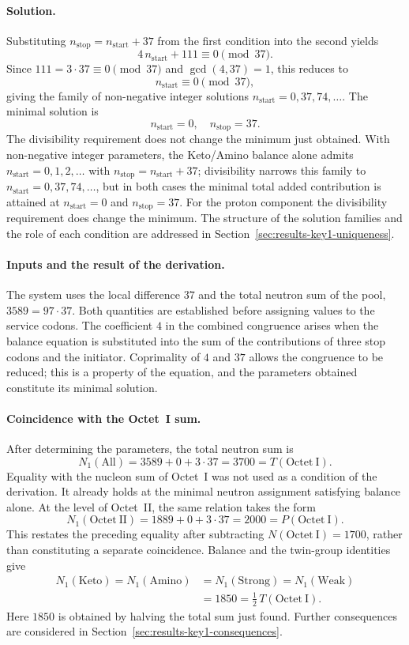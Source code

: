 \documentclass[11pt,a4paper]{article}
\renewcommand{\_}{\origunderscore\allowbreak}
\begin{document}
\paragraph{Solution.}
Substituting
$n_{\text{stop}} = n_{\text{start}} + 37$ from the first
condition into the second yields
\[
4\, n_{\text{start}} + 111 \equiv 0 \pmod{37}.
\]
Since $111 = 3 \cdot 37 \equiv 0 \pmod{37}$ and
$\gcd(4, 37) = 1$, this reduces to
\[
n_{\text{start}} \equiv 0 \pmod{37},
\]
giving the family of non-negative integer solutions
$n_{\text{start}} = 0, 37, 74, \ldots$.
The minimal solution is
\[
n_{\text{start}} = 0,
\quad
n_{\text{stop}} = 37.
\]
The divisibility requirement does not change the minimum
just obtained. With non-negative integer parameters, the
Keto/Amino balance alone admits
$n_{\text{start}} = 0, 1, 2, \ldots$ with
$n_{\text{stop}} = n_{\text{start}} + 37$; divisibility
narrows this family to
$n_{\text{start}} = 0, 37, 74, \ldots$, but in both cases
the minimal total added contribution is attained at
$n_{\text{start}} = 0$ and $n_{\text{stop}} = 37$. For the
proton component the divisibility requirement does change
the minimum. The structure of the solution families and
the role of each condition are addressed in
Section~\ref{sec:results-key1-uniqueness}.

\paragraph{Inputs and the result of the derivation.}
The system uses the local difference $37$ and the total
neutron sum of the pool, $3589=97\cdot37$. Both quantities
are established before assigning values to the service codons.
The coefficient $4$ in the combined congruence arises when
the balance equation is substituted into the sum of the
contributions of three stop codons and the initiator.
Coprimality of $4$ and $37$ allows the congruence to be
reduced; this is a property of the equation, and the
parameters obtained constitute its minimal solution.

\paragraph{Coincidence with the Octet~I sum.}
After determining the parameters, the total neutron sum is
\[
N_1(\mathrm{All})=3589+0+3\cdot37
=3700=T(\mathrm{Octet~I}).
\]
Equality with the nucleon sum of Octet~I was not used as
a condition of the derivation. It already holds at the
minimal neutron assignment satisfying balance alone.
At the level of Octet~II, the same relation takes the form
\[
N_1(\mathrm{Octet~II})=1889+0+3\cdot37
=2000=P(\mathrm{Octet~I}).
\]
This restates the preceding equality after subtracting
$N(\mathrm{Octet~I})=1700$, rather than constituting a
separate coincidence. Balance and the twin-group identities give
\[
\begin{aligned}
N_1(\mathrm{Keto})=N_1(\mathrm{Amino})
&=N_1(\mathrm{Strong})=N_1(\mathrm{Weak})\\
&=1850=\tfrac12\,T(\mathrm{Octet~I}).
\end{aligned}
\]
Here $1850$ is obtained by halving the total sum just found.
Further consequences are considered in
Section~\ref{sec:results-key1-consequences}.
\end{document}
